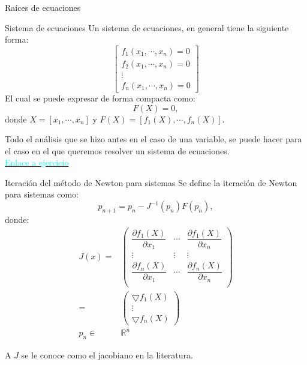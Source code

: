 \begin{frame}{Raíces de ecuaciones}
\begin{block}{Sistema de ecuaciones}
Un sistema de ecuaciones, en general tiene la siguiente forma:
\begin{displaymath}
\begin{bmatrix}
f_1(x_1,\cdots ,x_n)=0\\
f_2(x_1,\cdots ,x_n)=0\\
\vdots\\
f_n(x_1,\cdots ,x_n)=0
\end{bmatrix}
\end{displaymath}
El cual se puede expresar de forma compacta como:
$$F(X)=0,$$
donde $X=[x_1,\cdots,x_n]$ y $F(X)=[f_1(X),\cdots,f_n(X)].$
\end{block}
\indent Todo el análisis que se hizo antes en el caso de una variable, se puede hacer para el caso en el que queremos resolver un sistema de ecuaciones.\\
\framebreak
\hyperlink{EjercicioNewtonSistemas}{\textcolor{cyan}{Enlace a ejercicio}}
\begin{block}{Iteración del método de Newton para sistemas}
Se define la iteración de Newton para sistemas como:
$$p_{n+1}=p_{n}-J^{-1}(p_{n})F(p_{n}),$$
donde:
\begin{align*}
J(x)=&
\begin{pmatrix}
\dfrac{\partial f_1(X)}{\partial x_1} & \cdots & \dfrac{\partial f_1(X)}{\partial x_n}\\
\vdots &\vdots &\vdots\\
\dfrac{\partial f_n(X)}{\partial x_1} & \cdots & \dfrac{\partial f_n(X)}{\partial x_n}\\
\end{pmatrix}\\
=&
\begin{pmatrix}
\bigtriangledown f_1(X)\\
\vdots\\
\bigtriangledown f_n(X)
\end{pmatrix}\\
p_{n}\in &\mathbb{R}^n
\end{align*}
\end{block}
\indent A $J$ se le conoce como el jacobiano en la literatura.
\end{frame}
